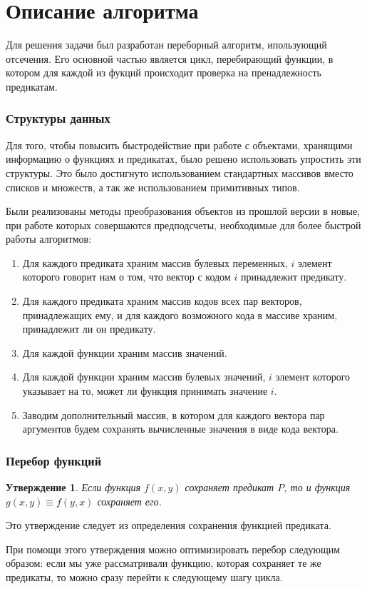 \documentclass[a4paper,14pt]{extreport}
\newtheorem{utv}{Утверждение}
\begin{document}
\section{Описание алгоритма}
Для решения задачи был разработан переборный алгоритм, ипользующий отсечения. Его основной частью является цикл, перебирающий функции, в котором для каждой из фукций происходит проверка на пренадлежность предикатам.
\subsubsection{Структуры данных}
Для того, чтобы повысить быстродействие при работе с объектами, хранящими информацию о функциях и предикатах, было решено использовать упростить эти структуры. Это было достигнуто использованием стандартных массивов вместо списков и множеств, а так же использованием примитивных типов.

Были реализованы методы преобразования объектов из прошлой версии в новые, при работе которых совершаются предподсчеты, необходимые для более быстрой работы алгоритмов:
\begin{enumerate}
\item Для каждого предиката храним массив булевых переменных, $i$ элемент которого говорит нам о том, что вектор с кодом $i$ принадлежит предикату. 
\item Для каждого предиката храним массив кодов всех пар векторов, принадлежащих ему, и для каждого возможного кода в массиве храним, принадлежит ли он предикату.
\item Для каждой функции храним массив значений. 
\item Для каждой функции храним массив булевых значений, $i$ элемент которого указывает на то, может ли функция принимать значение $i$. 
\item Заводим дополнительный массив, в котором для каждого вектора пар аргументов будем сохранять вычисленные значения в виде кода вектора. 
\end{enumerate} 

\subsubsection{Перебор функций}
\begin{utv}
Если функция $f(x, y)$ сохраняет предикат $P$, то и функция $g(x, y) \equiv f(y, x)$ сохраняет его.
\end{utv}
Это утверждение следует из определения сохранения функцией предиката.

При помощи этого утверждения можно оптимизировать перебор следующим образом: если мы уже рассматривали функцию, которая сохраняет те же предикаты, то можно сразу перейти к следующему шагу цикла.
\end{document}
